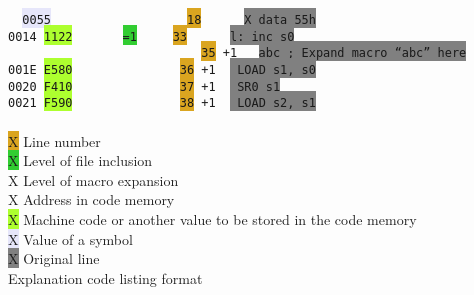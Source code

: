                 \begin{code}[h]
                        \mysmallfont{}
                        \verb'  '\texttt{\colorbox{Lavender}{0055}}\verb'                   '\texttt{\colorbox{Goldenrod}{18}}\verb'      '\texttt{\colorbox{Gray}{X      data     55h}} \\
                        \texttt{\colorbox{Apricot}{0014}}\verb' '\texttt{\colorbox{GreenYellow}{1122}}\verb'       '\texttt{\colorbox{LimeGreen}{=1}}\verb'     '\texttt{\colorbox{Goldenrod}{33}}\verb'      '\texttt{\colorbox{Gray}{l:     inc      s0}} \\
                        \verb'                           '\texttt{\colorbox{Goldenrod}{35}}\verb' '\texttt{\colorbox{ProcessBlue}{+1}}\verb'   '\texttt{\colorbox{Gray}{abc     ; Expand macro ``abc'' here}} \\
                        \texttt{\colorbox{Apricot}{001E}}\verb' '\texttt{\colorbox{GreenYellow}{E580}}\verb'               '\texttt{\colorbox{Goldenrod}{36}}\verb' '\texttt{\colorbox{ProcessBlue}{+1}}\verb'  '\texttt{\colorbox{Gray}{                LOAD     s1, s0}} \\
                        \texttt{\colorbox{Apricot}{0020}}\verb' '\texttt{\colorbox{GreenYellow}{F410}}\verb'               '\texttt{\colorbox{Goldenrod}{37}}\verb' '\texttt{\colorbox{ProcessBlue}{+1}}\verb'  '\texttt{\colorbox{Gray}{                SR0     s1}} \\
                        \texttt{\colorbox{Apricot}{0021}}\verb' '\texttt{\colorbox{GreenYellow}{F590}}\verb'               '\texttt{\colorbox{Goldenrod}{38}}\verb' '\texttt{\colorbox{ProcessBlue}{+1}}\verb'  '\texttt{\colorbox{Gray}{                LOAD     s2, s1}} \\\\
                        \colorbox{Goldenrod}{\color{Goldenrod}X} Line number \\
                        \colorbox{LimeGreen}{\color{LimeGreen}X} Level of file inclusion \\
                        \colorbox{ProcessBlue}{\color{ProcessBlue}X} Level of macro expansion \\
                        \colorbox{Apricot}{\color{Apricot}X} Address in code memory \\
                        \colorbox{GreenYellow}{\color{GreenYellow}X} Machine code or another value to be stored in the code memory \\
                        \colorbox{Lavender}{\color{Lavender}X} Value of a symbol \\
                        \colorbox{Gray}{\color{Gray}X} Original line \\

                        \caption{Explanation code listing format}
                \end{code}

